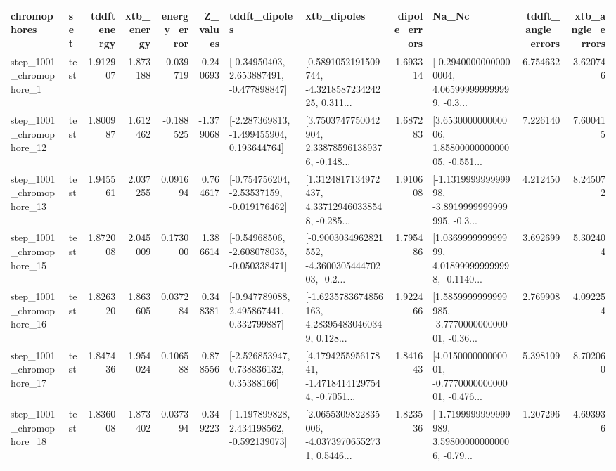 \begin{tabular}{llrrrrllrlrr}
\toprule
             chromophores &       set &  tddft\_energy &  xtb\_energy &  energy\_error &  Z\_values &                               tddft\_dipoles &                                        xtb\_dipoles &  dipole\_errors &                                              Na\_Nc &  tddft\_angle\_errors &  xtb\_angle\_errors \\
\midrule
  step\_1001\_chromophore\_1 &      test &      1.912907 &    1.873188 &     -0.039719 & -0.240693 &    [-0.34950403, 2.653887491, -0.477898847] &  [0.5891052191509744, -4.321858723424225, 0.311... &       1.693314 &  [-0.29400000000000004, 4.065999999999999, -0.3... &            6.754632 &          3.620746 \\
 step\_1001\_chromophore\_12 &      test &      1.800987 &    1.612462 &     -0.188525 & -1.379068 &   [-2.287369813, -1.499455904, 0.193644764] &  [3.7503747750042904, 2.338785961389376, -0.148... &       1.687283 &  [3.653000000000006, 1.8580000000000005, -0.551... &            7.226140 &          7.600415 \\
 step\_1001\_chromophore\_13 &      test &      1.945561 &    2.037255 &      0.091694 &  0.764617 &   [-0.754756204, -2.53537159, -0.019176462] &  [1.3124817134972437, 4.337129460338548, -0.285... &       1.910608 &  [-1.131999999999998, -3.8919999999999995, -0.3... &            4.212450 &          8.245072 \\
 step\_1001\_chromophore\_15 &      test &      1.872008 &    2.045009 &      0.173000 &  1.386614 &   [-0.54968506, -2.608078035, -0.050338471] &  [-0.9003034962821552, -4.360030544470203, -0.2... &       1.795486 &  [1.036999999999999, 4.018999999999998, -0.1140... &            3.692699 &          5.302404 \\
 step\_1001\_chromophore\_16 &      test &      1.826320 &    1.863605 &      0.037284 &  0.348381 &    [-0.947789088, 2.495867441, 0.332799887] &  [-1.6235783674856163, 4.283954830460349, 0.128... &       1.922466 &  [1.5859999999999985, -3.777000000000001, -0.36... &            2.769908 &          4.092254 \\
 step\_1001\_chromophore\_17 &      test &      1.847436 &    1.954024 &      0.106588 &  0.878556 &     [-2.526853947, 0.738836132, 0.35388166] &  [4.179425595617841, -1.47184141297544, -0.7051... &       1.841643 &  [4.015000000000001, -0.777000000000001, -0.476... &            5.398109 &          8.702060 \\
 step\_1001\_chromophore\_18 &      test &      1.836008 &    1.873402 &      0.037394 &  0.349223 &   [-1.197899828, 2.434198562, -0.592139073] &  [2.0655309822835006, -4.03739706552731, 0.5446... &       1.823536 &  [-1.7199999999999989, 3.598000000000006, -0.79... &            1.207296 &          4.693936 \\

\end{tabular}
